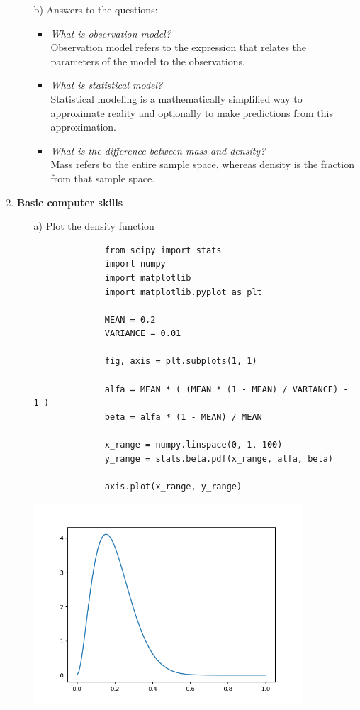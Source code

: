 \documentclass[11pt,a4paper,english]{article}
\begin{document}
\begin{enumerate}
\begin{itemize}
          \item[b)] Answers to the questions:
            \begin{itemize}
              \item {\it What is observation model?}\\
                Observation model refers to the expression that relates the parameters of the
                model to the observations.
              \item {\it What is statistical model?}\\
                Statistical modeling is a mathematically simplified way to approximate reality
                and optionally to make predictions from this approximation.
              \item {\it What is the difference between mass and density?}\\
                Mass refers to the entire sample space, whereas density is the fraction from that
                sample space.
            \end{itemize}
        \end{itemize}

      \item {\bf Basic computer skills}
        \begin{itemize}
          \item[a)] Plot the density function
            \begin{verbatim}
              from scipy import stats
              import numpy
              import matplotlib
              import matplotlib.pyplot as plt

              MEAN = 0.2
              VARIANCE = 0.01

              fig, axis = plt.subplots(1, 1)

              alfa = MEAN * ( (MEAN * (1 - MEAN) / VARIANCE) - 1 )
              beta = alfa * (1 - MEAN) / MEAN

              x_range = numpy.linspace(0, 1, 100)
              y_range = stats.beta.pdf(x_range, alfa, beta)

              axis.plot(x_range, y_range)
            \end{verbatim}
            \includegraphics[width=10cm]{prob_distribution.png}


\end{itemize}
\end{enumerate}
\end{document}
